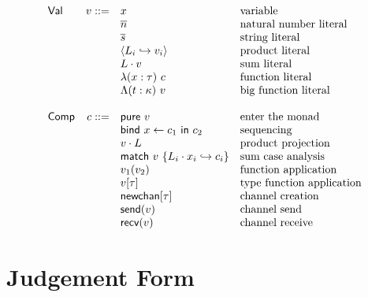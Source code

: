 \documentclass[12pt]{article}
\begin{document}
\[\begin{array}{l r l l}
\\
\textsf{Val}  &      v ::= & x                                 & \text{variable} \\
              &            & \overline{n}                      & \text{natural number literal} \\
              &            & \overline{s}                      & \text{string literal} \\
              &            & \langle
                             L_i \hookrightarrow v_i
                             \rangle                           & \text{product literal} \\
              &            & L \cdot v                         & \text{sum literal} \\
              &            & \lambda (x : \tau) \ c            & \text{function literal} \\
              &            & \Lambda (t : \kappa) \ v          & \text{big function literal} \\
\\
\textsf{Comp} &      c ::= & \textsf{pure} \ v                 & \text{enter the monad} \\
              &            & \textsf{bind} \ x \leftarrow c_1
                             \ \textsf{in} \ c_2               & \text{sequencing} \\
              &            & v \cdot L                         & \text{product projection} \\
              &            & \textsf{match} \ v \ \{
                             L_i \cdot x_i \hookrightarrow c_i
                             \}                                & \text{sum case analysis} \\
              &            & v_1(v_2)                          & \text{function application} \\
              &            & v[\tau]                           & \text{type function application} \\
              &            & \textsf{newchan}[\tau]            & \text{channel creation} \\
              &            & \textsf{send}(v)                  & \text{channel send} \\
              &            & \textsf{recv}(v)                  & \text{channel receive} \\
\end{array}
\]

\newpage
\section{Judgement Form}
\end{document}
